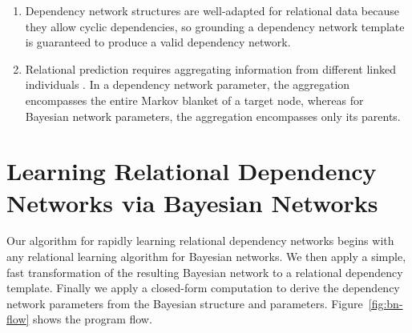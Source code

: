 \documentclass[runningheads,a4paper]{llncs}
\newcommand{\fixneeded}[1]{\textbf{[\footnotesize #1]}}
\newcommand{\iid}{i.i.d.}
\begin{document}
\begin{enumerate}
\item Dependency network structures are well-adapted for relational data because they allow cyclic dependencies, so grounding a dependency network template is guaranteed to produce a valid dependency network.
%
\item Relational prediction  requires aggregating information from different linked individuals \cite{Natarajan2008}. 
In a dependency network parameter, the aggregation encompasses the entire Markov blanket of a target node, whereas for Bayesian network parameters, the aggregation encompasses only its parents.
\end{enumerate}
%

\section{Learning Relational Dependency Networks via Bayesian Networks}
Our algorithm for rapidly learning relational dependency networks
begins with any relational learning algorithm for Bayesian networks. We then apply a simple, fast transformation of the resulting Bayesian network to a relational dependency template. Finally we apply a closed-form computation to derive the dependency network parameters from the Bayesian structure and parameters. Figure~\ref{fig:bn-flow} shows the program flow. 
\end{document}
